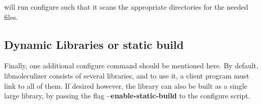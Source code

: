 will run configure such that it scans the appropriate
  directories for the needed files.  

\subsection{Dynamic Libraries or static build}
Finally, one additional configure command should be mentioned here.
By default, libmoleculizer consists of several libraries, and to use
it, a client program must link to all of them.  If desired however,
the library can also be built as a single large library, by passing
the flag {\bf --enable-static-build} to the configure script.
